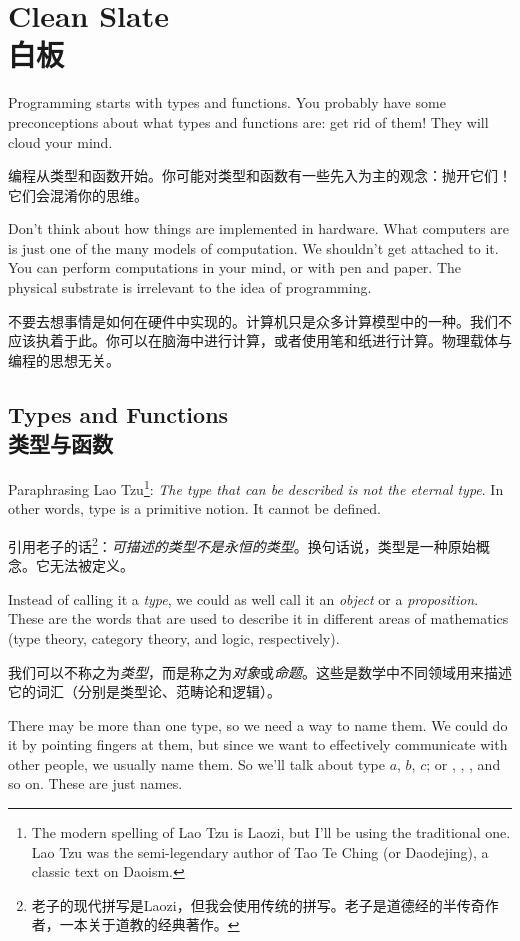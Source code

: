 \documentclass[DaoFP]{subfiles}
\begin{document}
 \chapter{Clean Slate\\白板}

 Programming starts with types and functions. You probably have some preconceptions about what types and functions are: get rid of them! They will cloud your mind.

 编程从类型和函数开始。你可能对类型和函数有一些先入为主的观念：抛开它们！它们会混淆你的思维。

 Don't think about how things are implemented in hardware. What computers are is just one of the many models of computation. We shouldn't get attached to it. You can perform computations in your mind, or with pen and paper. The physical substrate is irrelevant to the idea of programming.

 不要去想事情是如何在硬件中实现的。计算机只是众多计算模型中的一种。我们不应该执着于此。你可以在脑海中进行计算，或者使用笔和纸进行计算。物理载体与编程的思想无关。

 \section{Types and Functions\\类型与函数}

 Paraphrasing Lao Tzu\footnote{The modern spelling of Lao Tzu is Laozi, but I'll be using the traditional one. Lao Tzu was the semi-legendary author of Tao Te Ching (or Daodejing), a classic text on Daoism.}: \emph{The type that can be described is not the eternal type}. In other words, type is a primitive notion. It cannot be defined.

 引用老子的话\footnote{老子的现代拼写是Laozi，但我会使用传统的拼写。老子是道德经的半传奇作者，一本关于道教的经典著作。}：\emph{可描述的类型不是永恒的类型}。换句话说，类型是一种原始概念。它无法被定义。

 Instead of calling it a \emph{type}, we could as well call it an \emph{object} or a \emph{proposition}. These are the words that are used to describe it in different areas of mathematics (type theory, category theory, and logic, respectively).

 我们可以不称之为\emph{类型}，而是称之为\emph{对象}或\emph{命题}。这些是数学中不同领域用来描述它的词汇（分别是类型论、范畴论和逻辑）。

 There may be more than one type, so we need a way to name them. We could do it by pointing fingers at them, but since we want to effectively communicate with other people, we usually name them. So we'll talk about type $a$, $b$, $c$; or , , , and so on. These are just names.
\end{document}
